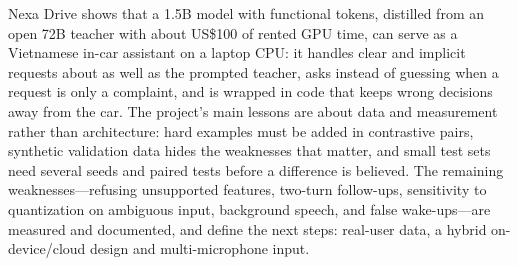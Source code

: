 Nexa Drive shows that a 1.5B model with functional tokens, distilled from an open 72B teacher with about US\$100 of rented GPU
time, can serve as a Vietnamese in-car assistant on a laptop CPU: it handles clear and implicit requests about as well as the
prompted teacher, asks instead of guessing when a request is only a complaint, and is wrapped in code that keeps wrong
decisions away from the car. The project's main lessons are about data and measurement rather than architecture: hard examples
must be added in contrastive pairs, synthetic validation data hides the weaknesses that matter, and small test sets need
several seeds and paired tests before a difference is believed. The remaining weaknesses---refusing unsupported features,
two-turn follow-ups,
sensitivity to quantization on ambiguous input, background speech, and false wake-ups---are measured and documented, and
define the next steps: real-user data, a hybrid on-device/cloud design and multi-microphone input.
